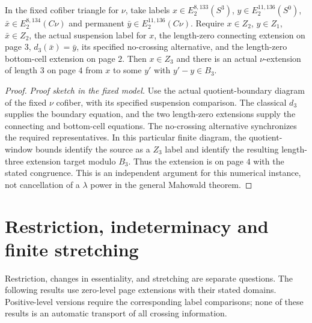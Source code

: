 \begin{theorem}
\label{sem:ProofTools:nu-zero-layer}
In the fixed cofiber triangle for $\nu$, take labels $x\in E_2^{8,133}(S^3)$, $y\in E_2^{11,136}(S^0)$, $\bar x\in E_2^{8,134}(C\nu)$ and permanent $\bar y\in E_2^{11,136}(C\nu)$. Require $x\in Z_2$, $y\in Z_1$, $\bar x\in Z_2$, the actual suspension label for $x$, the length-zero connecting extension on page $3$, $d_3(\bar x)=\bar y$, its specified no-crossing alternative, and the length-zero bottom-cell extension on page $2$. Then $x\in Z_3$ and there is an actual $\nu$-extension of length $3$ on page $4$ from $x$ to some $y'$ with $y'-y\in B_3$.
\end{theorem}
\begin{proof}
\textit{Proof sketch in the fixed model.}
Use the actual quotient-boundary diagram of the fixed $\nu$ cofiber, with its specified suspension comparison. The classical $d_3$ supplies the boundary equation, and the two length-zero extensions supply the connecting and bottom-cell equations. The no-crossing alternative synchronizes the required representatives. In this particular finite diagram, the quotient-window bounds identify the source as a $Z_3$ label and identify the resulting length-three extension target modulo $B_3$. Thus the extension is on page $4$ with the stated congruence. This is an independent argument for this numerical instance, not cancellation of a $\lambda$ power in the general Mahowald theorem.
\end{proof}

\section{Restriction, indeterminacy and finite stretching}

Restriction, changes in essentiality, and stretching are separate
questions. The following results use zero-level page extensions with
their stated domains. Positive-level versions require the corresponding
label comparisons; none of these results is an automatic transport
of all crossing information.

